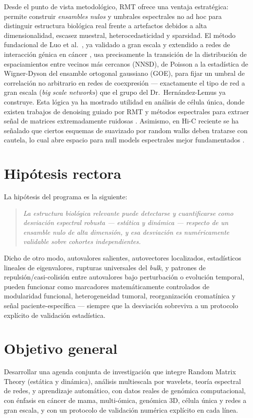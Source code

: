 \documentclass[11pt]{article}
\begin{document}
Desde el punto de vista metodológico, RMT ofrece una ventaja estratégica: permite construir \emph{ensambles nulos} y umbrales espectrales no ad hoc para distinguir estructura biológica real frente a artefactos debidos a alta dimensionalidad, escasez muestral, heterocedasticidad y sparsidad. El método fundacional de Luo et al.\ \cite{luo2007}, ya validado a gran escala \cite{gao2012} y extendido a redes de interacción génica en cáncer \cite{cancer2018}, usa precisamente la transición de la distribución de espaciamientos entre vecinos más cercanos (NNSD), de Poisson a la estadística de Wigner-Dyson del ensamble ortogonal gaussiano (GOE), para fijar un umbral de correlación no arbitrario en redes de coexpresión --- exactamente el tipo de red a gran escala (\emph{big scale networks}) que el grupo del Dr.\ Hernández-Lemus ya construye. Esta lógica ya ha mostrado utilidad en análisis de célula única, donde existen trabajos de denoising guiado por RMT y métodos espectrales para extraer señal de matrices extremadamente ruidosas \cite{aparicio2020, pnas2021}. Asimismo, en Hi-C reciente se ha señalado que ciertos esquemas de suavizado por random walks deben tratarse con cautela, lo cual abre espacio para null models espectrales mejor fundamentados \cite{hic2025}.

\section{Hipótesis rectora}
La hipótesis del programa es la siguiente:
\begin{quote}
\emph{La estructura biológica relevante puede detectarse y cuantificarse como desviación espectral robusta --- estática y dinámica --- respecto de un ensamble nulo de alta dimensión, y esa desviación es numéricamente validable sobre cohortes independientes.}
\end{quote}

Dicho de otro modo, autovalores salientes, autovectores localizados, estadísticos lineales de eigenvalores, rupturas universales del \emph{bulk}, y patrones de repulsión/casi-colisión entre autovalores bajo perturbación o evolución temporal, pueden funcionar como marcadores matemáticamente controlados de modularidad funcional, heterogeneidad tumoral, reorganización cromatínica y señal paciente-específica --- siempre que la desviación sobreviva a un protocolo explícito de validación estadística.

\section{Objetivo general}
Desarrollar una agenda conjunta de investigación que integre Random Matrix Theory (estática y dinámica), análisis multiescala por wavelets, teoría espectral de redes, y aprendizaje automático, con datos reales de genómica computacional, con énfasis en cáncer de mama, multi-ómica, genómica 3D, célula única y redes a gran escala, y con un protocolo de validación numérica explícito en cada línea.
\end{document}

